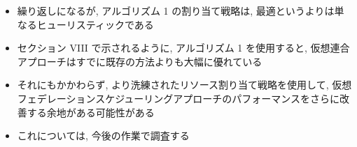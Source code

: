 \begin{frame}{}
    \begin{itemize}
        \item 繰り返しになるが, アルゴリズム 1 の割り当て戦略は, 最適というよりは単なるヒューリスティックである
\item セクション VIII で示されるように, アルゴリズム 1 を使用すると, 仮想連合アプローチはすでに既存の方法よりも大幅に優れている
\item それにもかかわらず, より洗練されたリソース割り当て戦略を使用して, 仮想フェデレーションスケジューリングアプローチのパフォーマンスをさらに改善する余地がある可能性がある
\item これについては, 今後の作業で調査する
    \end{itemize}
\end{frame}
